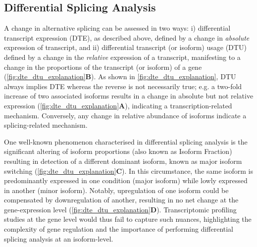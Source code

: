 \subsection{Differential Splicing Analysis}\label{intro:dtu}
A change in alternative splicing can be assessed in two ways: i) differential transcript expression (DTE), as described above, defined by a change in \textit{absolute} expression of transcript, and ii) differential transcript (or isoform) usage (DTU) defined by a change in the \textit{relative} expression of a transcript, manifesting to a change in the proportions of the transcript (or isoform) of a gene (\cref{fig:dte_dtu_explanation}\textbf{B}). As shown in \cref{fig:dte_dtu_explanation}, DTU always implies DTE whereas the reverse is not necessarily true; e.g. a two-fold increase of two associated isoforms results in a change in absolute but not relative expression (\cref{fig:dte_dtu_explanation}\textbf{A}), indicating a transcription-related mechanism. Conversely, any change in relative abundance of isoforms indicate a splicing-related mechanism. 

One well-known phenomenon characterised in differential splicing analysis is the significant altering of isoform proportions (also known as Isoform Fraction) resulting in detection of a different dominant isoform, known as major isoform switching (\cref{fig:dte_dtu_explanation}\textbf{C}). In this circumstance, the same isoform is predominantly expressed in one condition (major isoform) while lowly expressed in another (minor isoform). Notably, upregulation of one isoform could be compensated by downregulation of another, resulting in no net change at the gene-expression level (\cref{fig:dte_dtu_explanation}\textbf{D}). Transcriptomic profiling studies at the gene level would thus fail to capture such nuances, highlighting the complexity of gene regulation and the importance of performing differential splicing analysis at an isoform-level. 


